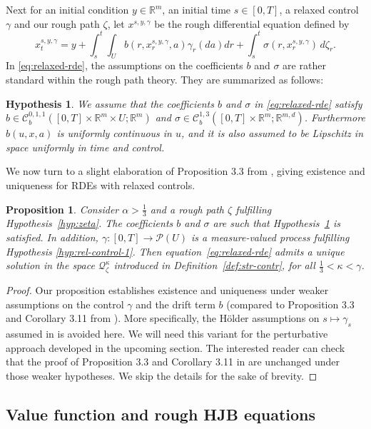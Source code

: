 \documentclass[12pt,reqno]{amsart}
\numberwithin{equation}{section}  %
\newcommand{\1}{{\bf 1}}
\newcommand{\2}{{\bf 2}}
\newcommand{\bzeta}{{\zeta}}
\newcommand{\R}{\mathbb R}
\newcommand{\cq}{\mathcal Q}
\newcommand{\al}{\alpha}
\newcommand{\ga}{\gamma}
\newcommand{\ka}{\kappa}
\newcommand{\si}{\sigma}
\newtheorem{hypothesis}[theorem]{Hypothesis}
\newtheorem{proposition}[theorem]{Proposition}
\theoremstyle{remark}
\theoremstyle{remark}
\newcommand{\beq}{\begin{equation}}
\newcommand{\eeq}{\end{equation}}
\begin{document}
\noindent
Next for an initial condition $y \in \R^m$, an initial time $s \in [0,T]$, a relaxed control $\ga$ and our rough path $\bzeta$, let $x^{s,y,\ga}$ be the rough differential equation defined by
\beq\label{eq:relaxed-rde}
x_t^{s,y,\ga} = y+\int_s^t \int_U b(r, x_r^{s,y,\ga},a)\ga_r(da)dr + \int_s^t \si(r, x_r^{s,y,\ga}) \, d \bzeta_r .
\eeq
In \eqref{eq:relaxed-rde}, the assumptions on the coefficients $b$ and $\si$ are rather standard within the rough path theory. They are summarized as follows:
\begin{hypothesis}\label{hyp:coeff}
	We assume that the coefficients $b$ and $\sigma$ in \eqref{eq:relaxed-rde} satisfy $b \in \mathcal C_b^{0,1,1}([0,T] \times \R^m \times U; \R^m)$ and $\sigma \in \mathcal C_b^{1,3}([0,T]\times \R^m; \R^{m,d})$. \emph{Furthermore $b(u, x, a)$ is uniformly continuous in $u$, and it is also assumed to be Lipschitz in space uniformly in time and control.}\end{hypothesis}
We now turn to a slight elaboration of Proposition 3.3 from \cite{CHT}, giving existence and uniqueness for RDEs with relaxed controls.
\begin{proposition}\label{ExistUniq2}
Consider $\al > \frac{1}{3}$ and a rough path $\bzeta$ fulfilling Hypothesis~\ref{hyp:zeta}. The coefficients $b$ and $\si$ are such that Hypothesis~\ref{hyp:coeff} is satisfied. In addition, $\ga \colon [0,T]\to \mathcal{P}(U)$ is a measure-valued process fulfilling Hypothesis \ref{hyp:rel-control-1}. Then equation~\eqref{eq:relaxed-rde} admits a unique solution in the space $\cq_{\bzeta}^{\ka}$ introduced in Definition~\ref{def:str-contr}, for all $\frac{1}{3} < \ka < \ga$.
\end{proposition}
\begin{proof}
    Our proposition establishes existence and uniqueness under weaker assumptions on the control $\gamma$ and the drift term $b$ (compared to Proposition 3.3 and Corollary 3.11 from \cite{CHT}). More specifically, the H\"older assumptions on $s\mapsto \gamma_{s}$ assumed in \cite{CHT} is avoided here. We will need this variant for the perturbative approach developed in the upcoming section. The interested reader can check that the proof of Proposition 3.3 and Corollary 3.11 in \cite{CHT} are unchanged under those weaker hypotheses. We skip the details for the sake of brevity.\end{proof}



\subsection{Value function and rough HJB equations}
\end{document}
